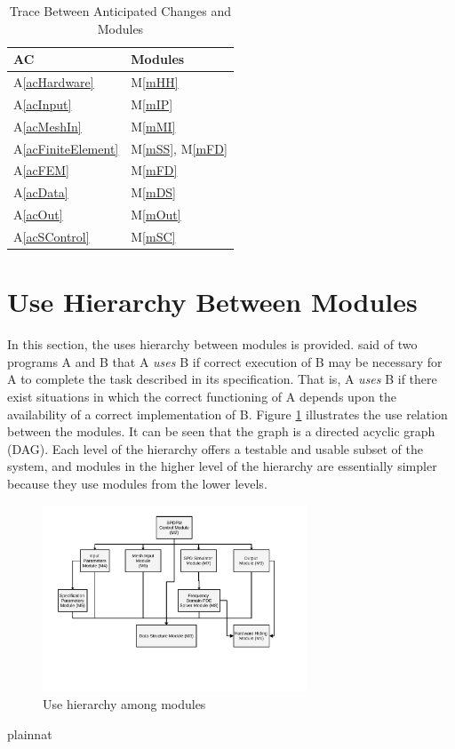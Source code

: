 \documentclass[12pt, titlepage]{article}
\begin{document}
	\begin{table}[H] \centering \begin{tabular}{p{} p{}}
			\toprule \textbf{AC} & \textbf{Modules}\\ \midrule A\ref{acHardware} &
			M\ref{mHH}\\ A\ref{acInput} & M\ref{mIP}\\ A\ref{acMeshIn} & M\ref{mMI}\\
			A\ref{acFiniteElement} & M\ref{mSS}, M\ref{mFD}\\ A\ref{acFEM} & M\ref{mFD}\\
			A\ref{acData} & M\ref{mDS}\\ A\ref{acOut} & M\ref{mOut}\\ A\ref{acSControl} &
			M\ref{mSC}\\ \bottomrule \end{tabular} \caption{Trace Between Anticipated
			Changes and Modules} \label{TblACT} \end{table}
	
	\section{Use Hierarchy Between Modules} \label{SecUse}
	
	In this section, the uses hierarchy between modules is provided.
	\citet{Parnas1978} said of two programs A and B that A {\em uses} B if correct
	execution of B may be necessary for A to complete the task described in its
	specification. That is, A {\em uses} B if there exist situations in which the
	correct functioning of A depends upon the availability of a correct
	implementation of B.  Figure \ref{FigUH} illustrates the use relation between
	the modules. It can be seen that the graph is a directed acyclic graph (DAG).
	Each level of the hierarchy offers a testable and usable subset of the system,
	and modules in the higher level of the hierarchy are essentially simpler because
	they use modules from the lower levels.
	
	\begin{figure}[H] \centering \includegraphics[width=0.7\textwidth]{MG-Chart.pdf}
		\caption{Use hierarchy among modules} \label{FigUH} \end{figure}
	
	
	 {plainnat} 
	
\end{document}

